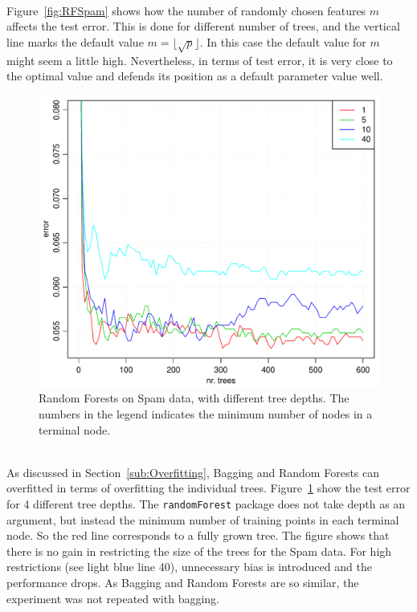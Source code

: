 \\
Figure~\ref{fig:RFSpam} shows how the number of randomly chosen features $m$ affects the test error. This is done for different number of trees, and the vertical line marks the default value $m = \lfloor \sqrt{p} \rfloor$. In this case the default value for $m$ might seem a little high. Nevertheless, in terms of test error, it is very close to the optimal value and defends its position as a default parameter value well. 
\\
\begin{figure}[htpb]
\begin{center}
    \includegraphics[scale=0.5]{./figures/RFTreeDepth.pdf}
\end{center}
\caption{Random Forests on Spam data, with different tree depths. The numbers in the legend indicates the minimum number of nodes in a terminal node.}
\label{fig:RFTreeDepth}
\end{figure}
\\
As discussed in Section~\ref{sub:Overfitting}, Bagging and Random Forests can overfitted in terms of overfitting the individual trees. Figure~\ref{fig:RFTreeDepth} show the test error for 4 different tree depths. The \verb+randomForest+ package does not take depth as an argument, but instead the minimum number of training points in each terminal node. So the red line corresponds to a fully grown tree. The figure shows that there is no gain in restricting the size of the trees for the Spam data. For high restrictions (see light blue line 40), unnecessary bias is introduced and the performance drops.  As Bagging and Random Forests are so similar, the experiment was not repeated with bagging.
